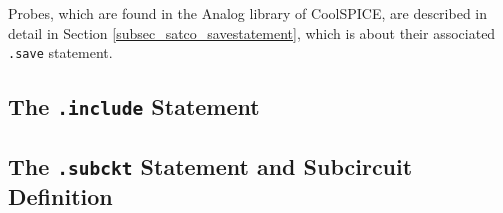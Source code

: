 Probes, which are found in the \textsf{Analog} library of CoolSPICE, are described in detail in Section \ref{subsec_satco_savestatement}, which is about their associated \texttt{.save} statement.  

\subsection{The \texttt{.include} Statement}
\label{sec_sceadm_includestatement}

\subsection{The \texttt{.subckt} Statement and Subcircuit Definition}
\label{sec_sceadm_subcktstatement}

